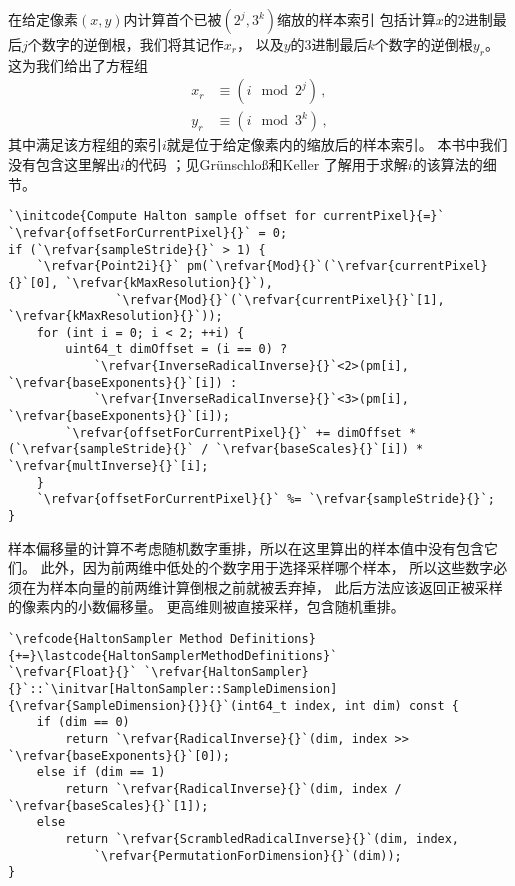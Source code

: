 在给定像素$(x,y)$内计算首个已被$(2^j,3^k)$缩放的样本索引
包括计算$x$的2进制最后$j$个数字的逆倒根，我们将其记作$x_r$，
以及$y$的3进制最后$k$个数字的逆倒根$y_r$。这为我们给出了方程组
\begin{align*}
    x_r & \equiv(i \mod 2^j)\, , \\
    y_r & \equiv(i \mod 3^k)\, ,
\end{align*}
其中满足该方程组的索引$i$就是位于给定像素内的缩放后的样本索引。
本书中我们没有包含这里解出$i$的代码{}
；见Gr\"{u}nschlo\ss{}和Keller \parencite*{10.1007/978-3-642-04107-5_25}
了解用于求解$i$的该算法的细节。
\begin{lstlisting}
`\initcode{Compute Halton sample offset for currentPixel}{=}`
`\refvar{offsetForCurrentPixel}{}` = 0;
if (`\refvar{sampleStride}{}` > 1) {
    `\refvar{Point2i}{}` pm(`\refvar{Mod}{}`(`\refvar{currentPixel}{}`[0], `\refvar{kMaxResolution}{}`),
               `\refvar{Mod}{}`(`\refvar{currentPixel}{}`[1], `\refvar{kMaxResolution}{}`));
    for (int i = 0; i < 2; ++i) {
        uint64_t dimOffset = (i == 0) ?
            `\refvar{InverseRadicalInverse}{}`<2>(pm[i], `\refvar{baseExponents}{}`[i]) :
            `\refvar{InverseRadicalInverse}{}`<3>(pm[i], `\refvar{baseExponents}{}`[i]);
        `\refvar{offsetForCurrentPixel}{}` += dimOffset * (`\refvar{sampleStride}{}` / `\refvar{baseScales}{}`[i]) * `\refvar{multInverse}{}`[i];
    }
    `\refvar{offsetForCurrentPixel}{}` %= `\refvar{sampleStride}{}`;
}
\end{lstlisting}

样本偏移量的计算不考虑随机数字重排，所以在这里算出的样本值中没有包含它们。
此外，因为前两维中低处的个数字用于选择采样哪个样本，
所以这些数字必须在为样本向量的前两维计算倒根之前就被丢弃掉，
此后方法应该返回正被采样的像素内的小数偏移量。
更高维则被直接采样，包含随机重排。
\begin{lstlisting}
`\refcode{HaltonSampler Method Definitions}{+=}\lastcode{HaltonSamplerMethodDefinitions}`
`\refvar{Float}{}` `\refvar{HaltonSampler}{}`::`\initvar[HaltonSampler::SampleDimension]{\refvar{SampleDimension}{}}{}`(int64_t index, int dim) const {
    if (dim == 0)
        return `\refvar{RadicalInverse}{}`(dim, index >> `\refvar{baseExponents}{}`[0]);
    else if (dim == 1)
        return `\refvar{RadicalInverse}{}`(dim, index / `\refvar{baseScales}{}`[1]);
    else
        return `\refvar{ScrambledRadicalInverse}{}`(dim, index,
            `\refvar{PermutationForDimension}{}`(dim));
}
\end{lstlisting}
